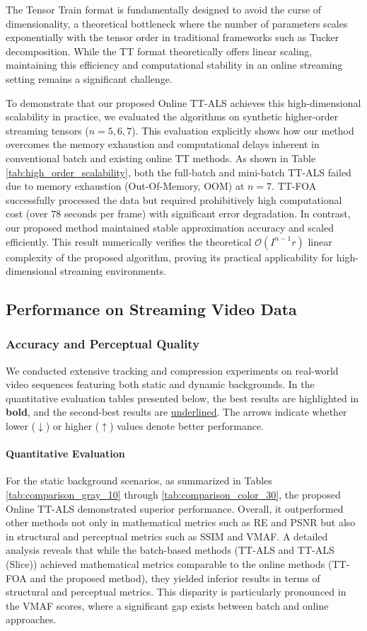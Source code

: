 \documentclass[a4paper, 11pt]{article}
\theoremstyle{plain}
\theoremstyle{definition}
\theoremstyle{remark}
\begin{document}
The Tensor Train format is fundamentally designed to avoid the curse of dimensionality, a theoretical bottleneck where the number of parameters scales exponentially with the tensor order in traditional frameworks such as Tucker decomposition.
While the TT format theoretically offers linear scaling, maintaining this efficiency and computational stability in an online streaming setting remains a significant challenge.

To demonstrate that our proposed Online TT-ALS achieves this high-dimensional scalability in practice, we evaluated the algorithms on synthetic higher-order streaming tensors ($n=5, 6, 7$).
This evaluation explicitly shows how our method overcomes the memory exhaustion and computational delays inherent in conventional batch and existing online TT methods.
As shown in Table \ref{tab:high_order_scalability}, both the full-batch and mini-batch TT-ALS failed due to memory exhaustion (Out-Of-Memory, OOM) at $n=7$.
TT-FOA successfully processed the data but required prohibitively high computational cost (over $78$ seconds per frame) with significant error degradation.
In contrast, our proposed method maintained stable approximation accuracy and scaled efficiently.
This result numerically verifies the theoretical $\mathcal{O}(I^{n-1} r)$ linear complexity of the proposed algorithm, proving its practical applicability for high-dimensional streaming environments.

\subsection{Performance on Streaming Video Data}
\subsubsection{Accuracy and Perceptual Quality}
We conducted extensive tracking and compression experiments on real-world video sequences featuring both static and dynamic backgrounds. In the quantitative evaluation tables presented below, the best results are highlighted in \textbf{bold}, and the second-best results are \underline{underlined}. The arrows indicate whether lower ($\downarrow$) or higher ($\uparrow$) values denote better performance.

\paragraph{Quantitative Evaluation}
For the static background scenarios, as summarized in Tables \ref{tab:comparison_gray_10} through \ref{tab:comparison_color_30}, the proposed Online TT-ALS demonstrated superior performance.
Overall, it outperformed other methods not only in mathematical metrics such as RE and PSNR but also in structural and perceptual metrics such as SSIM and VMAF.
A detailed analysis reveals that while the batch-based methods (TT-ALS and TT-ALS (Slice)) achieved mathematical metrics comparable to the online methods (TT-FOA and the proposed method), they yielded inferior results in terms of structural and perceptual metrics.
This disparity is particularly pronounced in the VMAF scores, where a significant gap exists between batch and online approaches. 
\end{document}
